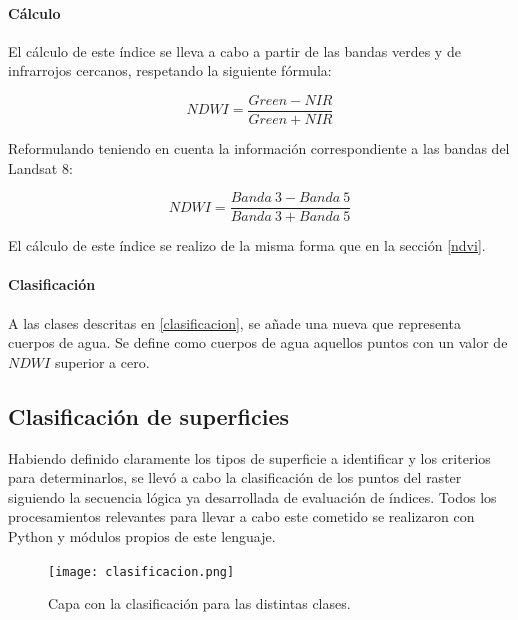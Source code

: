\paragraph{Cálculo}

El cálculo de este índice se lleva a cabo a partir de las bandas verdes y de infrarrojos cercanos, respetando la siguiente fórmula:

$$NDWI = \frac{Green - NIR}{Green + NIR}$$

Reformulando teniendo en cuenta la información correspondiente a las bandas del Landsat 8:

$$NDWI = \frac{Banda~3-Banda~5}{Banda~3+Banda~5}$$

El cálculo de este índice se realizo de la misma forma que en la sección \ref{ndvi}.


\paragraph{Clasificación} 

A las clases descritas en \ref{clasificacion}, se añade una nueva que representa cuerpos de agua. Se define como cuerpos de agua aquellos puntos con un valor de $NDWI$ superior a cero.


\subsection{Clasificación de superficies}

Habiendo definido claramente los tipos de superficie a identificar y los criterios para determinarlos, se llevó a cabo la clasificación de los puntos del raster siguiendo la secuencia lógica ya desarrollada de evaluación de índices. Todos los procesamientos relevantes para llevar a cabo este cometido se realizaron con Python y módulos propios de este lenguaje.

\begin{figure}[H]
	\texttt{[image: clasificacion.png]}
	\centering
	\caption{Capa con la clasificación para las distintas clases.}
	\label{fig:clasificacion}
\end{figure}
